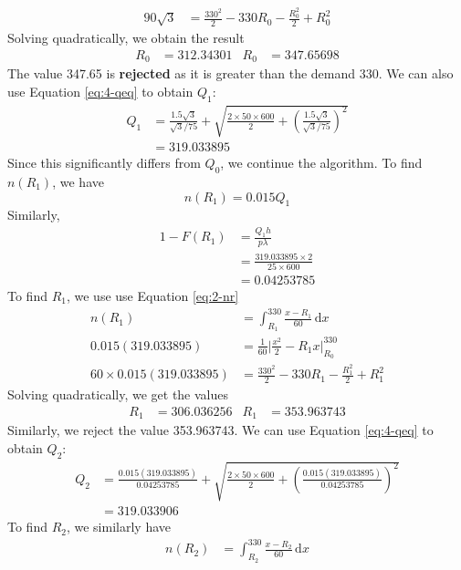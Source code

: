 \documentclass[12pt]{article}
\begin{document}
\begin{align*}
    90\sqrt{3} &= \frac{330^{2}}{2} - 330 R_{0} - \frac{R_{0}^{2}}{2} + R_{0}^{2} 
\end{align*} Solving quadratically, we obtain the result \begin{align*}
    R_{0} &= \mathbf{312.34301} & R_{0} &= 347.65698 
\end{align*} The value 347.65 is \textbf{rejected} as it is greater than the demand 330. We can also use Equation \ref{eq:4-qeq} to obtain $Q_{1}$: \begin{align*}
    Q_{1} &= \frac{1.5\sqrt{3}}{\sqrt{3} / 75} + \sqrt{ \frac{2 \times 50 \times 600}{2} + \left( \frac{1.5\sqrt{3}}{\sqrt{3} / 75} \right)^{2}} \\ 
    &= 319.033895
\end{align*} Since this significantly differs from $Q_{0}$, we continue the algorithm. To find $n(R_{1})$, we have \begin{equation*}
    n(R_{1}) = 0.015 Q_{1} 
\end{equation*} Similarly, \begin{align*}
    1-F(R_{1}) &= \frac{Q_{1} h}{p\lambda} \\
    &= \frac{319.033895 \times 2}{25 \times 600} \\ 
    &= 0.04253785
\end{align*} To find $R_{1}$, we use use Equation \ref{eq:2-nr} \begin{align*}
    n(R_{1}) &= \int_{R_{1}}^{330} \frac{x-R_{1}}{60} \, \mathrm{d}x \\ 
    0.015(319.033895) &= \frac{1}{60} \Big| \frac{x^{2}}{2} - R_{1}x \Big|^{330}_{R_{0}} \\ 
    60\times 0.015(319.033895) &= \frac{330^{2}}{2} - 330 R_{1} - \frac{R_{1}^{2}}{2} + R_{1}^{2} 
\end{align*} Solving quadratically, we get the values \begin{align*}
    R_{1} &= \mathbf{306.036256} & R_{1} &= 353.963743
\end{align*} Similarly, we reject the value 353.963743. We can use Equation \ref{eq:4-qeq} to obtain $Q_{2}$: \begin{align*}
    Q_{2} &= \frac{0.015(319.033895)}{0.04253785} + \sqrt{ \frac{2 \times 50 \times 600}{2} + \left( \frac{0.015(319.033895)}{0.04253785} \right)^{2}} \\ 
    &= 319.033906
\end{align*} To find $R_{2}$, we similarly have \begin{align*}
    n(R_{2}) &= \int_{R_{2}}^{330} \frac{x-R_{2}}{60} \, \mathrm{d}x \\ 

\end{align*}
\end{document}
